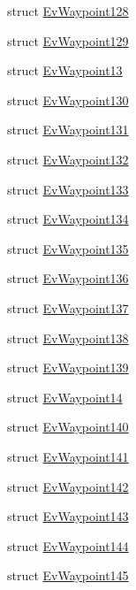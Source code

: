 \begin{DoxyCompactItemize}
\item 
struct \hyperlink{structmove__base__z__client_1_1EvWaypoint128}{Ev\+Waypoint128}
\item 
struct \hyperlink{structmove__base__z__client_1_1EvWaypoint129}{Ev\+Waypoint129}
\item 
struct \hyperlink{structmove__base__z__client_1_1EvWaypoint13}{Ev\+Waypoint13}
\item 
struct \hyperlink{structmove__base__z__client_1_1EvWaypoint130}{Ev\+Waypoint130}
\item 
struct \hyperlink{structmove__base__z__client_1_1EvWaypoint131}{Ev\+Waypoint131}
\item 
struct \hyperlink{structmove__base__z__client_1_1EvWaypoint132}{Ev\+Waypoint132}
\item 
struct \hyperlink{structmove__base__z__client_1_1EvWaypoint133}{Ev\+Waypoint133}
\item 
struct \hyperlink{structmove__base__z__client_1_1EvWaypoint134}{Ev\+Waypoint134}
\item 
struct \hyperlink{structmove__base__z__client_1_1EvWaypoint135}{Ev\+Waypoint135}
\item 
struct \hyperlink{structmove__base__z__client_1_1EvWaypoint136}{Ev\+Waypoint136}
\item 
struct \hyperlink{structmove__base__z__client_1_1EvWaypoint137}{Ev\+Waypoint137}
\item 
struct \hyperlink{structmove__base__z__client_1_1EvWaypoint138}{Ev\+Waypoint138}
\item 
struct \hyperlink{structmove__base__z__client_1_1EvWaypoint139}{Ev\+Waypoint139}
\item 
struct \hyperlink{structmove__base__z__client_1_1EvWaypoint14}{Ev\+Waypoint14}
\item 
struct \hyperlink{structmove__base__z__client_1_1EvWaypoint140}{Ev\+Waypoint140}
\item 
struct \hyperlink{structmove__base__z__client_1_1EvWaypoint141}{Ev\+Waypoint141}
\item 
struct \hyperlink{structmove__base__z__client_1_1EvWaypoint142}{Ev\+Waypoint142}
\item 
struct \hyperlink{structmove__base__z__client_1_1EvWaypoint143}{Ev\+Waypoint143}
\item 
struct \hyperlink{structmove__base__z__client_1_1EvWaypoint144}{Ev\+Waypoint144}
\item 
struct \hyperlink{structmove__base__z__client_1_1EvWaypoint145}{Ev\+Waypoint145}
\item 

\end{DoxyCompactItemize}
